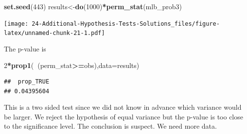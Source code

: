 \documentclass[
]{book}
\newenvironment{Shaded}{\begin{snugshade}}{\end{snugshade}}
\newcommand{\DataTypeTok}[1]{\textcolor[rgb]{0.13,0.29,0.53}{#1}}
\newcommand{\DecValTok}[1]{\textcolor[rgb]{0.00,0.00,0.81}{#1}}
\newcommand{\KeywordTok}[1]{\textcolor[rgb]{0.13,0.29,0.53}{\textbf{#1}}}
\newcommand{\NormalTok}[1]{#1}
\newcommand{\OperatorTok}[1]{\textcolor[rgb]{0.81,0.36,0.00}{\textbf{#1}}}
\newcommand{\StringTok}[1]{\textcolor[rgb]{0.31,0.60,0.02}{#1}}
\begin{document}
\begin{Shaded}
\begin{Highlighting}[]
\KeywordTok{set.seed}\NormalTok{(}\DecValTok{443}\NormalTok{)}
\NormalTok{results<-}\KeywordTok{do}\NormalTok{(}\DecValTok{1000}\NormalTok{)}\OperatorTok{*}\KeywordTok{perm_stat}\NormalTok{(mlb_prob3)}
\end{Highlighting}
\end{Shaded}

\begin{Shaded}
\end{Shaded}

\texttt{[image: 24-Additional-Hypothesis-Tests-Solutions\_files/figure-latex/unnamed-chunk-21-1.pdf]}

The p-value is

\begin{Shaded}
\begin{Highlighting}[]
\DecValTok{2}\OperatorTok{*}\KeywordTok{prop1}\NormalTok{(}\OperatorTok{~}\NormalTok{(perm_stat}\OperatorTok{>=}\NormalTok{obs),}\DataTypeTok{data=}\NormalTok{results)}
\end{Highlighting}
\end{Shaded}

\begin{verbatim}
##  prop_TRUE 
## 0.04395604
\end{verbatim}

This is a two sided test since we did not know in advance which variance would be larger. We reject the hypothesis of equal variance but the p-value is too close to the significance level. The conclusion is suspect. We need more data.
\end{document}
